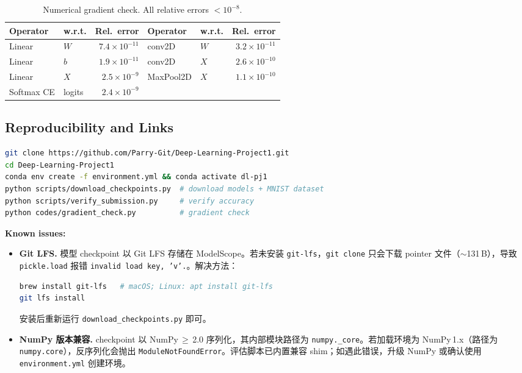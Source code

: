 \documentclass[11pt,fontset=fandol]{ctexart}
\begin{document}
\begin{table}[H]
\centering\small
\begin{tabular}{@{}llr@{\qquad}llr@{}}
\toprule
Operator & w.r.t. & Rel.\ error & Operator & w.r.t. & Rel.\ error \\
\midrule
Linear      & $W$      & $7.4\times10^{-11}$ & conv2D    & $W$ & $3.2\times10^{-11}$ \\
Linear      & $b$      & $1.9\times10^{-11}$ & conv2D    & $X$ & $2.6\times10^{-10}$ \\
Linear      & $X$      & $2.5\times10^{-9}$  & MaxPool2D & $X$ & $1.1\times10^{-10}$ \\
Softmax CE  & logits   & $2.4\times10^{-9}$  & & & \\
\bottomrule
\end{tabular}
\caption{Numerical gradient check. All relative errors $< 10^{-8}$.}\label{tab:gradcheck}
\end{table}

\subsection{Reproducibility and Links}

\begin{lstlisting}[language=bash]
git clone https://github.com/Parry-Git/Deep-Learning-Project1.git
cd Deep-Learning-Project1
conda env create -f environment.yml && conda activate dl-pj1
python scripts/download_checkpoints.py  # download models + MNIST dataset
python scripts/verify_submission.py     # verify accuracy
python codes/gradient_check.py          # gradient check
\end{lstlisting}

\noindent\textbf{Known issues:}
\begin{itemize}
    \item \textbf{Git LFS.}\; 模型 checkpoint 以 Git LFS 存储在 ModelScope。若未安装 \texttt{git-lfs}，\texttt{git clone} 只会下载 pointer 文件（$\sim$131\,B），导致 \texttt{pickle.load} 报错 \texttt{invalid load key, 'v'.}。解决方法：
\begin{lstlisting}[language=bash]
brew install git-lfs   # macOS; Linux: apt install git-lfs
git lfs install
\end{lstlisting}
    安装后重新运行 \texttt{download\_checkpoints.py} 即可。
    \item \textbf{NumPy 版本兼容.}\; checkpoint 以 NumPy\,$\ge$\,2.0 序列化，其内部模块路径为 \texttt{numpy.\_core}。若加载环境为 NumPy\,1.x（路径为 \texttt{numpy.core}），反序列化会抛出 \texttt{ModuleNotFoundError}。评估脚本已内置兼容 shim；如遇此错误，升级 NumPy 或确认使用 \texttt{environment.yml} 创建环境。
\end{itemize}
\end{document}
